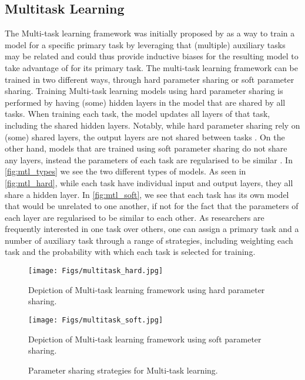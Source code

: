 \subsection{Multitask Learning}
%
The Multi-task learning framework was initially proposed by \citet{Caruana:1997} as a way to train a model for a specific primary task by leveraging that (multiple) auxiliary tasks may be related and could thus provide inductive biases for the resulting model to take advantage of for its primary task. The multi-task learning framework can be trained in two different ways, through hard parameter sharing or soft parameter sharing. Training Multi-task learning models using hard parameter sharing is performed by having (some) hidden layers in the model that are shared by all tasks. When training each task, the model updates all layers of that task, including the shared hidden layers. Notably, while hard parameter sharing rely on (some) shared layers, the output layers are not shared between tasks \cite{CITE: Hard parameter sharing paper}. On the other hand, models that are trained using soft parameter sharing do not share any layers, instead the parameters of each task are regularised to be similar \cite{CITE: Soft parameter sharing paper - See Sebastian Ruder's blogpost on MTL for reference}. In \autoref{fig:mtl_types} we see the two different types of models. As seen in \autoref{fig:mtl_hard}, while each task have individual input and output layers, they all share a hidden layer. In \autoref{fig:mtl_soft}, we see that each task has its own model that would be unrelated to one another, if not for the fact that the parameters of each layer are regularised to be similar to each other. As researchers are frequently interested in one task over others, one can assign a primary task and a number of auxiliary task through a range of strategies, including weighting each task and the probability with which each task is selected for training.

\begin{figure}
 \centering
 \begin{minipage}{0.5\linewidth}
   \centering
   \texttt{[image: Figs/multitask\_hard.jpg]}
   \caption{Depiction of Multi-task learning framework using hard parameter sharing.}
   \label{fig:mtl_hard}
 \end{minipage}
 \begin{minipage}{0.5\linewidth}
   \centering
    \texttt{[image: Figs/multitask\_soft.jpg]}
   \caption{Depiction of Multi-task learning framework using soft parameter sharing.}
   \label{fig:mtl_soft}
 \end{minipage}
 \caption{Parameter sharing strategies for Multi-task learning.}
 \label{fig:mtl_types}
\end{figure}

